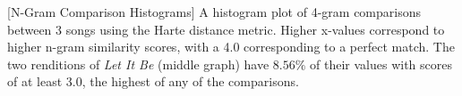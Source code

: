 [N-Gram Comparison Histograms] A histogram plot of 4-gram comparisons between 3 songs using the Harte distance metric. Higher x-values correspond to higher n-gram similarity scores, with a 4.0 corresponding to a perfect match. The two renditions of \textit{Let It Be} (middle graph) have $8.56\%$ of their values with scores of at least 3.0, the highest of any of the comparisons.